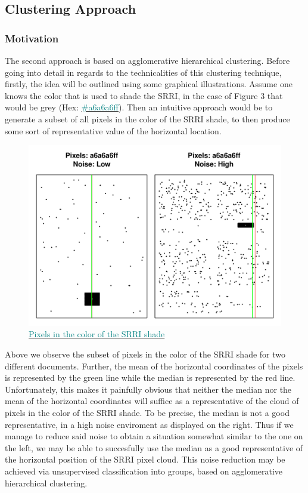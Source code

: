 \documentclass[aodsor,preprint]{imsart}
\numberwithin{equation}{section}
\theoremstyle{plain}
\begin{document}
\subsection{Clustering Approach}
\subsubsection{Motivation}
The second approach is based on agglomerative hierarchical clustering. Before going into detail in regards to the technicalities of this clustering technique, firstly, the idea will be outlined using some graphical illustrations. Assume one knows the color that is used to shade the SRRI, in the case of Figure 3 that would be grey (Hex: \href{https://www.color-hex.com/color/a6a6a6}{\textcolor{teal}{\#a6a6a6ff}}). Then an intuitive approach would be to generate a subset of all pixels in the color of the SRRI shade, to then produce some sort of representative value of the horizontal location.

\begin{figure}[H]
	\includegraphics[width = 12cm]{highnoiselownoise.pdf}
	\caption{\href{https://github.com/Base-R-Best-R/KID/blob/main/Code/Tests/Shade_ext.pdf}{\textcolor{teal}{Pixels in the color of the SRRI shade}}}
\end{figure}

Above we observe the subset of pixels in the color of the SRRI shade for two different documents. Further, the mean of the horizontal coordinates of the pixels is represented by the green line while the median is represented by the red line. Unfortunately, this makes it painfully obvious that neither the median nor the mean of the horizontal coordinates will suffice as a representative of the cloud of pixels in the color of the SRRI shade. To be precise, the median is not a good representative, in a high noise enviroment as displayed on the right. Thus if we manage to reduce said noise to obtain a situation somewhat similar to the one on the left, we may be able to succesfully use the median as a good representative of the horizontal position of the SRRI pixel cloud. This noise reduction may be achieved via unsupervised classification into groups, based on agglomerative hierarchical clustering.
\newpage
\end{document}
